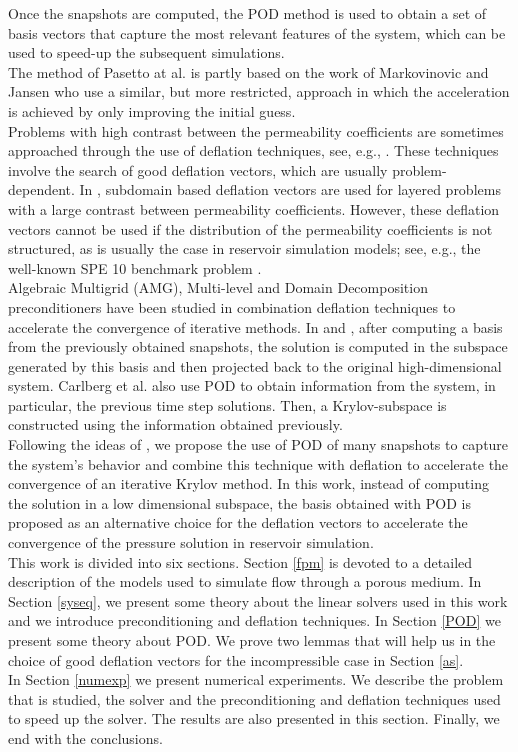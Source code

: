 \documentclass[12pt]{article}
\begin{document}
Once the snapshots are computed, the POD method is used to obtain a set of basis vectors that capture the most relevant features of the system, which can be used to speed-up the subsequent simulations.\\
The method of Pasetto at al. \cite{Pasetto16} is partly based on the work of Markovinovic and Jansen \cite{Mark06} who use a similar, but more restricted, approach in which the acceleration is 
achieved by only improving the initial guess.\\
Problems with high contrast between the permeability coefficients are sometimes approached through the use of deflation techniques, see, e.g., \cite{Vuik99}. These techniques involve the search of good deflation vectors, which are usually problem-dependent. In \cite{Vuik99}, subdomain based deflation vectors are used for layered problems with a large contrast between permeability coefficients. However, 
these deflation vectors cannot be used if the distribution of the permeability coefficients is not structured, as is usually the case in reservoir simulation models; see, e.g., the well-known SPE 10 benchmark problem \cite{Christie01}.\\
Algebraic Multigrid (AMG)\cite{Klie07}, Multi-level and Domain Decomposition \cite{Tang09} preconditioners have been studied in combination deflation techniques to accelerate the convergence of iterative methods.
In \cite{Mark06,Astrid11} and \cite{Pasetto16}, after computing a basis from the previously obtained snapshots, the solution is computed in the subspace generated by this basis and then projected back to the original high-dimensional system. Carlberg et al. \cite{Carlberg15} also use POD to obtain information from the system, in particular, the previous time step solutions. Then, a Krylov-subspace is constructed using the information obtained previously.\\
Following the ideas of \cite{Astrid11,Mark06,Pasetto16,Carlberg15}, we propose the use of POD of many snapshots to capture the system's behavior and combine this technique with deflation to accelerate the convergence of an iterative Krylov method.
In this work, instead of computing the solution in a low dimensional subspace, the basis obtained with POD is proposed as an alternative choice for the deflation vectors to accelerate the convergence of the pressure solution in reservoir simulation.  \\
This work is divided into six sections. 
  Section \ref{fpm} is devoted to a detailed description of the models used to simulate flow through a porous medium. In Section \ref{syseq}, we present some theory about the linear solvers used in this work and we introduce preconditioning 
  and deflation techniques. 
  In Section \ref{POD} we present some theory about POD. We prove two lemmas that will help us in the choice of good deflation vectors for the 
  incompressible case in Section \ref{as}.\\
 In Section \ref{numexp} we present numerical experiments. We describe the problem that is studied, the solver and the preconditioning and deflation techniques used to speed up the solver. The results are also presented in this section.
 Finally, we end with the conclusions.
\end{document}

